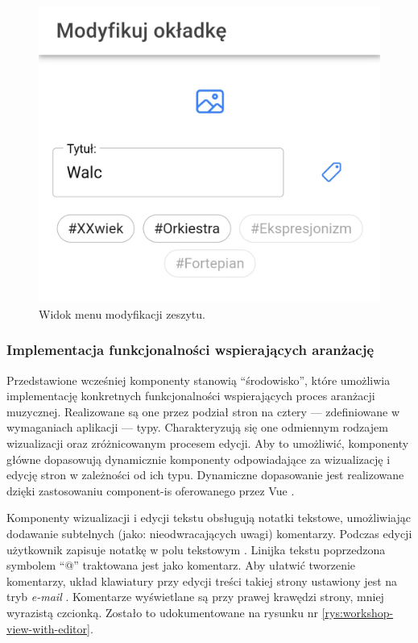 \begin{figure}[H]
	\begin{center}
		\includegraphics[scale=0.15]{media/BookMenu.jpg}
	\end{center}
	\caption{Widok menu modyfikacji zeszytu.}
	\label{rys:book-menu}
\end{figure}

\subsubsection{Implementacja funkcjonalności wspierających aranżację}
Przedstawione wcześniej komponenty stanowią \enquote{środowisko}, które umożliwia implementację konkretnych funkcjonalności
wspierających proces aranżacji muzycznej. Realizowane są one przez podział stron na cztery — zdefiniowane w wymaganiach aplikacji — typy.
Charakteryzują się one odmiennym rodzajem wizualizacji oraz zróżnicowanym procesem edycji. Aby to umożliwić, komponenty główne
dopasowują dynamicznie komponenty odpowiadające za wizualizację i edycję stron w zależności od ich typu.
Dynamiczne dopasowanie jest realizowane dzięki zastosowaniu component-is oferowanego przez Vue \cite{vue}.

Komponenty wizualizacji i edycji tekstu obsługują notatki tekstowe, umożliwiając dodawanie subtelnych (jako: nieodwracających uwagi)
komentarzy. Podczas edycji użytkownik zapisuje notatkę w polu tekstowym \cite{ionic}. Linijka tekstu poprzedzona symbolem \enquote{@} traktowana jest
jako komentarz. Aby ułatwić tworzenie komentarzy, układ klawiatury przy edycji treści takiej strony ustawiony jest na tryb \textit{e-mail} \cite{ionic}.
Komentarze wyświetlane są przy prawej krawędzi strony, mniej wyrazistą czcionką. Zostało to udokumentowane na rysunku nr \ref{rys:workshop-view-with-editor}.

